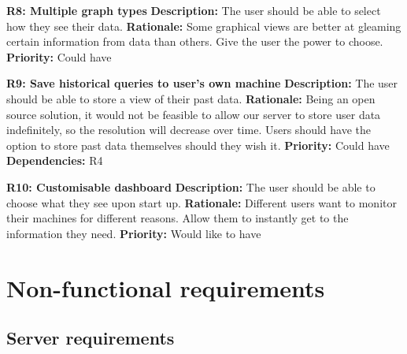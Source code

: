 \documentclass{l3proj}
\begin{document}
\textbf{R8: Multiple graph types} \newline
\textbf{Description:} The user should be able to select how they see their data. \newline
\textbf{Rationale:} Some graphical views are better at gleaming certain information from data than others. Give the user the power to choose. \newline
\textbf{Priority:} Could have

\textbf{R9: Save historical queries to user's own machine} \newline
\textbf{Description:} The user should be able to store a view of their past data. \newline
\textbf{Rationale:} Being an open source solution, it would not be feasible to allow our server to store user data indefinitely, so the resolution will decrease over time. Users should have the option to store past data themselves should they wish it. \newline
\textbf{Priority:} Could have \newline
\textbf{Dependencies:} R4

\textbf{R10: Customisable dashboard} \newline
\textbf{Description:} The user should be able to choose what they see upon start up. \newline
\textbf{Rationale:} Different users want to monitor their machines for different reasons. Allow them to instantly get to the information they need. \newline
\textbf{Priority:} Would like to have


\section{Non-functional requirements}
\label{nfrequirements}


\subsection{Server requirements}
\end{document}
